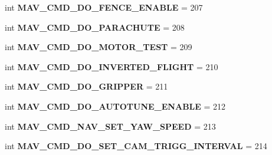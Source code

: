 \begin{DoxyCompactItemize}
\item 
\mbox{\label{namespacepymavlink_1_1dialects_1_1v10_a785d6b9f6d2caf45b2714bdc4ffd854f}} 
int {\bfseries M\+A\+V\+\_\+\+C\+M\+D\+\_\+\+D\+O\+\_\+\+F\+E\+N\+C\+E\+\_\+\+E\+N\+A\+B\+LE} = 207
\item 
\mbox{\label{namespacepymavlink_1_1dialects_1_1v10_ab72de3462de14e4d55f00d87ea616f44}} 
int {\bfseries M\+A\+V\+\_\+\+C\+M\+D\+\_\+\+D\+O\+\_\+\+P\+A\+R\+A\+C\+H\+U\+TE} = 208
\item 
\mbox{\label{namespacepymavlink_1_1dialects_1_1v10_ad181b9a7a29c232586317b73450faa66}} 
int {\bfseries M\+A\+V\+\_\+\+C\+M\+D\+\_\+\+D\+O\+\_\+\+M\+O\+T\+O\+R\+\_\+\+T\+E\+ST} = 209
\item 
\mbox{\label{namespacepymavlink_1_1dialects_1_1v10_ace5ad29227427f3533524826cfa26230}} 
int {\bfseries M\+A\+V\+\_\+\+C\+M\+D\+\_\+\+D\+O\+\_\+\+I\+N\+V\+E\+R\+T\+E\+D\+\_\+\+F\+L\+I\+G\+HT} = 210
\item 
\mbox{\label{namespacepymavlink_1_1dialects_1_1v10_a80a64c7c21ad519efc70aead9e30939f}} 
int {\bfseries M\+A\+V\+\_\+\+C\+M\+D\+\_\+\+D\+O\+\_\+\+G\+R\+I\+P\+P\+ER} = 211
\item 
\mbox{\label{namespacepymavlink_1_1dialects_1_1v10_a563bfbfa2cd22799a6e0e0aced9ad9f5}} 
int {\bfseries M\+A\+V\+\_\+\+C\+M\+D\+\_\+\+D\+O\+\_\+\+A\+U\+T\+O\+T\+U\+N\+E\+\_\+\+E\+N\+A\+B\+LE} = 212
\item 
\mbox{\label{namespacepymavlink_1_1dialects_1_1v10_ae3146fbf696940c899bdf09f4a325545}} 
int {\bfseries M\+A\+V\+\_\+\+C\+M\+D\+\_\+\+N\+A\+V\+\_\+\+S\+E\+T\+\_\+\+Y\+A\+W\+\_\+\+S\+P\+E\+ED} = 213
\item 
\mbox{\label{namespacepymavlink_1_1dialects_1_1v10_a1d265d9b01a02a11b854a6568f4aa0d2}} 
int {\bfseries M\+A\+V\+\_\+\+C\+M\+D\+\_\+\+D\+O\+\_\+\+S\+E\+T\+\_\+\+C\+A\+M\+\_\+\+T\+R\+I\+G\+G\+\_\+\+I\+N\+T\+E\+R\+V\+AL} = 214
\item 

\end{DoxyCompactItemize}
